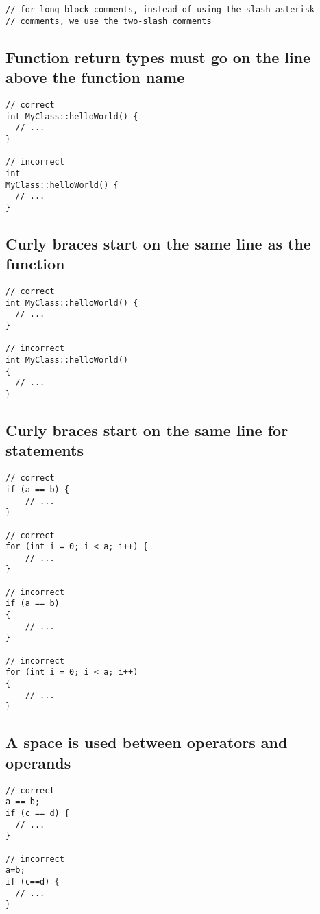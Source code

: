 \documentclass{article}
\begin{document}
\begin{verbatim}
// for long block comments, instead of using the slash asterisk
// comments, we use the two-slash comments
\end{verbatim}

\subsection{Function return types must go on the line above the function name}

\begin{verbatim}
// correct
int MyClass::helloWorld() {
  // ...
}

// incorrect
int
MyClass::helloWorld() {
  // ...
}
\end{verbatim}

\subsection{Curly braces start on the same line as the function}

\begin{verbatim}
// correct
int MyClass::helloWorld() {
  // ...
}

// incorrect
int MyClass::helloWorld()
{
  // ...
}
\end{verbatim}

\subsection{Curly braces start on the same line for statements}

\begin{verbatim}
// correct
if (a == b) {
    // ...
}

// correct
for (int i = 0; i < a; i++) {
    // ...
}

// incorrect
if (a == b)
{
    // ...
}

// incorrect
for (int i = 0; i < a; i++)
{
    // ...
}
\end{verbatim}

\subsection{A space is used between operators and operands}

\begin{verbatim}
// correct
a == b;
if (c == d) {
  // ...
}

// incorrect
a=b;
if (c==d) {
  // ...
}
\end{verbatim}
\end{document}
